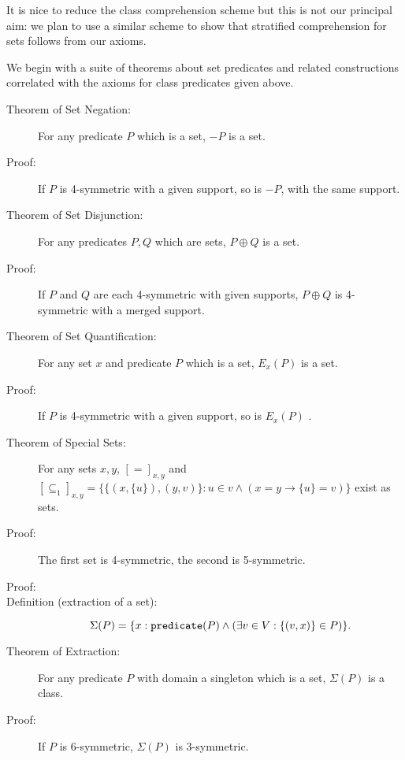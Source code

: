 \documentclass[12pt]{article}
\begin{document}
It is nice to reduce the class comprehension scheme but this is not our principal aim:  we plan to use a similar scheme to show that stratified comprehension for sets follows from our axioms.

We begin with a suite of theorems about set predicates and related constructions correlated with the axioms for class predicates given above.

\begin{description}

\item[Theorem  of Set Negation:]  For any predicate $P$ which is a set, $-P$ is a set.

\item[Proof:]  If $P$ is 4-symmetric with a given support, so is $-P$, with the same support.

\item[Theorem of Set Disjunction:]  For any predicates $P,Q$ which are sets, $P \oplus Q$ is a set.

\item[Proof:]  If $P$ and $Q$ are each 4-symmetric with given supports, $P \oplus Q$ is 4-symmetric with a merged support.

\item[Theorem  of Set Quantification:]  For any set $x$ and predicate $P$ which is a set, $E_x(P)$ is a set.

\item[Proof:]  If $P$ is 4-symmetric with a given support, so is $E_x(P)$ .

\item[Theorem of Special Sets:]  For any sets $x,y$, $[=]_{x,y}$  and $[\subseteq_1]_{x,y}=\{\{(x,\{u\}),(y,v)\}:u \in v \wedge (x=y \rightarrow \{u\}=v)\} $ exist as sets.

\item[Proof:]  The first set is 4-symmetric, the second is 5-symmetric.


\item[Proof:]


\item[Definition (extraction of a set):]  $$\Sigma(P) = \{x:{\tt predicate}(P) \wedge (\exists v\in V:\{(v,x)\} \in P)\}.$$

\item[Theorem of Extraction:]  For any predicate $P$ with domain a singleton which is a set, $\Sigma(P)$ is a class.

\item[Proof:]  If $P$ is 6-symmetric,  $\Sigma(P)$ is 3-symmetric.

\end{description}
\end{document}
